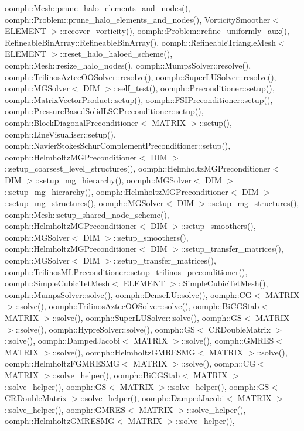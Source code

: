 oomph\+::\+Mesh\+::prune\+\_\+halo\+\_\+elements\+\_\+and\+\_\+nodes(), oomph\+::\+Problem\+::prune\+\_\+halo\+\_\+elements\+\_\+and\+\_\+nodes(), Vorticity\+Smoother$<$ E\+L\+E\+M\+E\+N\+T $>$\+::recover\+\_\+vorticity(), oomph\+::\+Problem\+::refine\+\_\+uniformly\+\_\+aux(), Refineable\+Bin\+Array\+::\+Refineable\+Bin\+Array(), oomph\+::\+Refineable\+Triangle\+Mesh$<$ E\+L\+E\+M\+E\+N\+T $>$\+::reset\+\_\+halo\+\_\+haloed\+\_\+scheme(), oomph\+::\+Mesh\+::resize\+\_\+halo\+\_\+nodes(), oomph\+::\+Mumps\+Solver\+::resolve(), oomph\+::\+Trilinos\+Aztec\+O\+O\+Solver\+::resolve(), oomph\+::\+Super\+L\+U\+Solver\+::resolve(), oomph\+::\+M\+G\+Solver$<$ D\+I\+M $>$\+::self\+\_\+test(), oomph\+::\+Preconditioner\+::setup(), oomph\+::\+Matrix\+Vector\+Product\+::setup(), oomph\+::\+F\+S\+I\+Preconditioner\+::setup(), oomph\+::\+Pressure\+Based\+Solid\+L\+S\+C\+Preconditioner\+::setup(), oomph\+::\+Block\+Diagonal\+Preconditioner$<$ M\+A\+T\+R\+I\+X $>$\+::setup(), oomph\+::\+Line\+Visualiser\+::setup(), oomph\+::\+Navier\+Stokes\+Schur\+Complement\+Preconditioner\+::setup(), oomph\+::\+Helmholtz\+M\+G\+Preconditioner$<$ D\+I\+M $>$\+::setup\+\_\+coarsest\+\_\+level\+\_\+structures(), oomph\+::\+Helmholtz\+M\+G\+Preconditioner$<$ D\+I\+M $>$\+::setup\+\_\+mg\+\_\+hierarchy(), oomph\+::\+M\+G\+Solver$<$ D\+I\+M $>$\+::setup\+\_\+mg\+\_\+hierarchy(), oomph\+::\+Helmholtz\+M\+G\+Preconditioner$<$ D\+I\+M $>$\+::setup\+\_\+mg\+\_\+structures(), oomph\+::\+M\+G\+Solver$<$ D\+I\+M $>$\+::setup\+\_\+mg\+\_\+structures(), oomph\+::\+Mesh\+::setup\+\_\+shared\+\_\+node\+\_\+scheme(), oomph\+::\+Helmholtz\+M\+G\+Preconditioner$<$ D\+I\+M $>$\+::setup\+\_\+smoothers(), oomph\+::\+M\+G\+Solver$<$ D\+I\+M $>$\+::setup\+\_\+smoothers(), oomph\+::\+Helmholtz\+M\+G\+Preconditioner$<$ D\+I\+M $>$\+::setup\+\_\+transfer\+\_\+matrices(), oomph\+::\+M\+G\+Solver$<$ D\+I\+M $>$\+::setup\+\_\+transfer\+\_\+matrices(), oomph\+::\+Trilinos\+M\+L\+Preconditioner\+::setup\+\_\+trilinos\+\_\+preconditioner(), oomph\+::\+Simple\+Cubic\+Tet\+Mesh$<$ E\+L\+E\+M\+E\+N\+T $>$\+::\+Simple\+Cubic\+Tet\+Mesh(), oomph\+::\+Mumps\+Solver\+::solve(), oomph\+::\+Dense\+L\+U\+::solve(), oomph\+::\+C\+G$<$ M\+A\+T\+R\+I\+X $>$\+::solve(), oomph\+::\+Trilinos\+Aztec\+O\+O\+Solver\+::solve(), oomph\+::\+Bi\+C\+G\+Stab$<$ M\+A\+T\+R\+I\+X $>$\+::solve(), oomph\+::\+Super\+L\+U\+Solver\+::solve(), oomph\+::\+G\+S$<$ M\+A\+T\+R\+I\+X $>$\+::solve(), oomph\+::\+Hypre\+Solver\+::solve(), oomph\+::\+G\+S$<$ C\+R\+Double\+Matrix $>$\+::solve(), oomph\+::\+Damped\+Jacobi$<$ M\+A\+T\+R\+I\+X $>$\+::solve(), oomph\+::\+G\+M\+R\+E\+S$<$ M\+A\+T\+R\+I\+X $>$\+::solve(), oomph\+::\+Helmholtz\+G\+M\+R\+E\+S\+M\+G$<$ M\+A\+T\+R\+I\+X $>$\+::solve(), oomph\+::\+Helmholtz\+F\+G\+M\+R\+E\+S\+M\+G$<$ M\+A\+T\+R\+I\+X $>$\+::solve(), oomph\+::\+C\+G$<$ M\+A\+T\+R\+I\+X $>$\+::solve\+\_\+helper(), oomph\+::\+Bi\+C\+G\+Stab$<$ M\+A\+T\+R\+I\+X $>$\+::solve\+\_\+helper(), oomph\+::\+G\+S$<$ M\+A\+T\+R\+I\+X $>$\+::solve\+\_\+helper(), oomph\+::\+G\+S$<$ C\+R\+Double\+Matrix $>$\+::solve\+\_\+helper(), oomph\+::\+Damped\+Jacobi$<$ M\+A\+T\+R\+I\+X $>$\+::solve\+\_\+helper(), oomph\+::\+G\+M\+R\+E\+S$<$ M\+A\+T\+R\+I\+X $>$\+::solve\+\_\+helper(), oomph\+::\+Helmholtz\+G\+M\+R\+E\+S\+M\+G$<$ M\+A\+T\+R\+I\+X $>$\+::solve\+\_\+helper(), 
